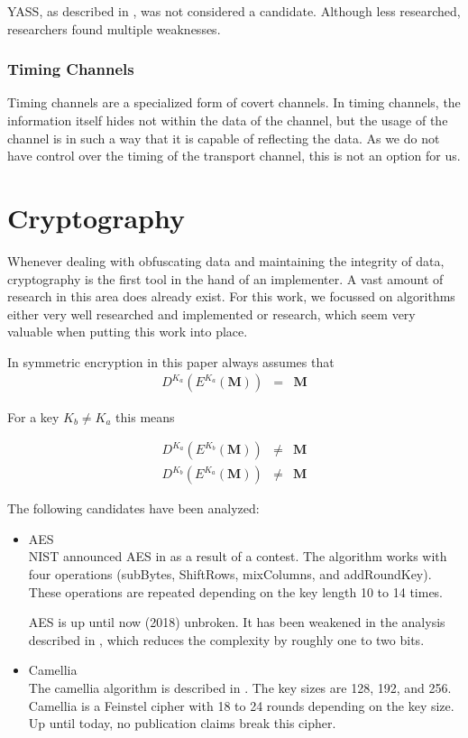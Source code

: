 
YASS, as described in \cite{solanki2007yass}, was not considered a candidate. Although less researched, researchers found multiple weakness\-es\cite{kodovsky2010modern,li2009steganalysis}.

\subsubsection{Timing Channels}

Timing channels are a specialized form of covert channels. In timing channels, the information itself hides not within the data of the channel, but the usage of the channel is in such a way that it is capable of reflecting the data. As we do not have control over the timing of the transport channel, this is not an option for us.

\section{Cryptography}

Whenever dealing with obfuscating data and maintaining the integrity of data, cryptography is the first tool in the hand of an implementer. A vast amount of research in this area does already exist. For this work, we focussed on algorithms either very well researched and implemented or research, which seem very valuable when putting this work into place. 

In symmetric encryption in this paper always assumes that
\begin{eqnarray}
D^{K_a}\left(E^{K_a}\left(\mathbf{M}\right)\right) & = & \mathbf{M}
\end{eqnarray} 

For a key $K_b\neq K_a$ this means

\begin{eqnarray}
D^{K_a}\left(E^{K_b}\left(\mathbf{M}\right)\right) & \neq & \mathbf{M}\\
D^{K_b}\left(E^{K_a}\left(\mathbf{M}\right)\right) & \neq & \mathbf{M}
\end{eqnarray} 

The following candidates have been analyzed:
\begin{itemize}
	\item AES\\
	NIST announced AES in \citeyear{standard2001announcing} as a result of a contest. The algorithm works with four operations (subBytes, ShiftRows, mixColumns, and addRoundKey). These operations are repeated depending on the key length 10 to 14 times. 
	
	AES is up until now (2018) unbroken. It has been weakened in the analysis described in \cite{tao2015improving}, which reduces the complexity by roughly one to two bits. 
	
	\item Camellia\\
	The camellia algorithm is described in \cite{RFC3713}. The key sizes are 128, 192, and 256. Camellia is a Feinstel cipher with 18 to 24 rounds depending on the key size. Up until today, no publication claims break this cipher. 
\end{itemize}

